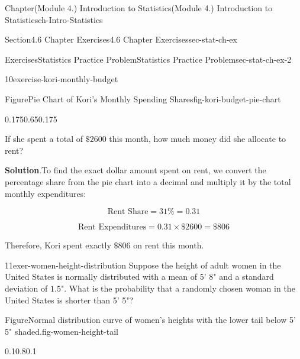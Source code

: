 \documentclass[oneside,10pt,]{book}
\newcommand{\blocktitlefont}{\relax}
\newcommand{\alert}[1]{\textbf{\textit{#1}}}
\begin{document}
\begin{chapterptx}{Chapter}{(Module 4.) Introduction to Statistics}{}{(Module 4.) Introduction to Statistics}{}{}{ch-Intro-Statistics}
\begin{sectionptx}{Section}{4.6 Chapter Exercises}{}{4.6 Chapter Exercises}{}{}{sec-stat-ch-ex}
\begin{exercises-subsection-numberless}{Exercises}{Statistics Practice Problem}{}{Statistics Practice Problem}{}{}{sec-stat-ch-ex-2}
\begin{divisionexercise}{10}{}{}{exercise-kori-monthly-budget}
\begin{figureptx}{Figure}{Pie Chart of Kori's Monthly Spending Shares}{fig-kori-budget-pie-chart}{}
\begin{image}{0.175}{0.65}{0.175}{}
{%
}%
\end{image}%
\tcblower
\end{figureptx}%
If she spent a total of \(\$2600\) this month, how much money did she allocate to rent?%
\par\smallskip%
\noindent\textbf{\blocktitlefont Solution}.\hypertarget{exercise-kori-monthly-budget-2}{}\quad{}To find the exact dollar amount spent on rent, we convert the percentage share from the pie chart into a decimal and multiply it by the total monthly expenditures:%
\par
%
\begin{equation*}
\text{Rent Share} = 31\% = 0.31
\end{equation*}
%
\par
%
\begin{equation*}
\text{Rent Expenditures} = 0.31 \times \$2600 = \$806
\end{equation*}
%
\par
Therefore, Kori spent exactly \alert{\(\$806\)} on rent this month.%
\end{divisionexercise}%
\begin{divisionexercise}{11}{}{}{exer-women-height-distribution}%
Suppose the height of adult women in the United States is normally distributed with a mean of 5' 8" and a standard deviation of \(1.5\)". What is the probability that a randomly chosen woman in the United States is shorter than 5' 5"?%
\begin{figureptx}{Figure}{Normal distribution curve of women's heights with the lower tail below 5' 5" shaded.}{fig-women-height-tail}{}%
\begin{image}{0.1}{0.8}{0.1}{}%
\end{image}
\end{figureptx}
\end{divisionexercise}
\end{exercises-subsection-numberless}
\end{sectionptx}
\end{chapterptx}
\end{document}

